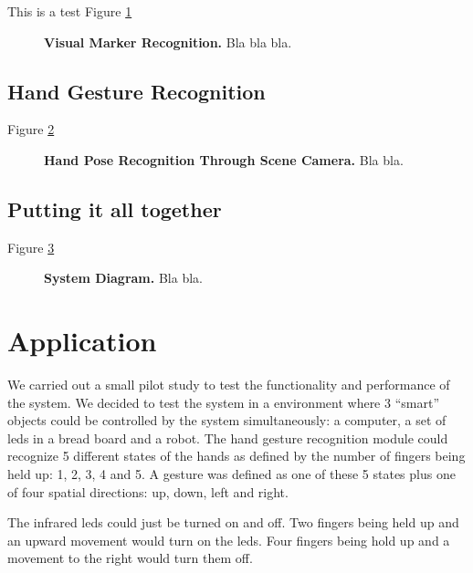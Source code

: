 \documentclass[jou,a4paper,notxfonts]{apa}
\begin{document}
This is a test Figure \ref{visualMarker}

\begin{figure}[tp]
 \caption{\textbf{Visual Marker Recognition.} Bla bla bla.}
 \label{visualMarker}
\end{figure}


\subsection{Hand Gesture Recognition}

Figure \ref{hand}

\begin{figure}[tp]
 \caption{\textbf{Hand Pose Recognition Through Scene Camera.} Bla bla.}
 \label{hand}
\end{figure}

\subsection{Putting it all together}
Figure \ref{systemDiagram}

\begin{figure}[tp]
 \caption{\textbf{System Diagram.} Bla bla.}
 \label{systemDiagram}
\end{figure}


\section{Application}
We carried out a small pilot study to test the functionality and performance of the system. We decided to test the
system in a environment where 3 ``smart'' objects could be controlled by the system simultaneously: a computer, a set of
leds in a bread board and a robot. The hand gesture recognition module could recognize 5 different states of the hands
as defined by the number of fingers being held up: 1, 2, 3, 4 and 5. A gesture was defined as one of these 5 states plus
one of four spatial directions: up, down, left and right.

The infrared leds could just be turned on and off. Two fingers being held up and an upward movement would turn on the
leds. Four fingers being hold up and a movement to the right would turn them off.
\end{document}
